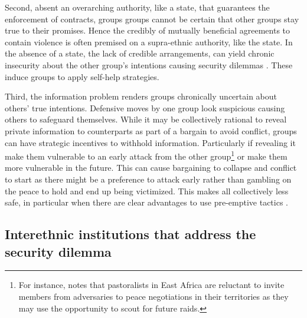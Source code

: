 Second, absent an overarching authority, like a state, that guarantees the
enforcement of contracts, groups groups cannot be certain that other groups stay
true to their promises. Hence the credibly of mutually beneficial agreements to
contain violence is often premised on a supra-ethnic authority, like the state.
In the absence of a state, the lack of credible arrangements, can yield chronic
insecurity about the other group’s intentions causing security dilemmas
\citep[51]{Lake_1996}. These induce groups to apply self-help strategies. 

Third, the information problem renders groups chronically uncertain about
others’ true intentions. Defensive moves by one group look suspicious causing
others to safeguard themselves. While it may be collectively rational to reveal
private information to counterparts as part of a bargain to avoid conflict,
groups can have strategic incentives to withhold information. Particularly if
revealing it make them vulnerable to an early attack from the other
group\footnote{For instance, \citet{Eaton_2008} notes that pastoralists in East
	Africa are reluctant to invite members from adversaries to peace
negotiations in their territories as they may use the opportunity to scout for
future raids.} or make them more vulnerable in the future. This can cause
bargaining to collapse and conflict to start as there might be a preference to
attack early rather than gambling on the peace to hold and end up being
victimized. This makes all collectively less safe, in particular when there are
clear advantages to use pre-emptive tactics \citep[53]{Lake_1996}.

\subsection{Interethnic institutions that address the security dilemma} 
\label{Interethnic institutions that address the security dilemma}

